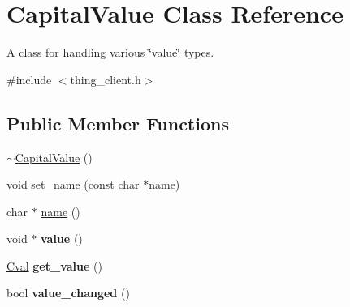 \hypertarget{classCapitalValue}{\section{Capital\-Value Class Reference}
\label{classCapitalValue}
}


A class for handling various \char`\"{}value\char`\"{} types.  




{\ttfamily \#include $<$thing\-\_\-client.\-h$>$}

\subsection*{Public Member Functions}
\begin{DoxyCompactItemize}
\item 
\hyperlink{classCapitalValue_ad85f7a220abaddaa9cd17e8dad2dacf5}{$\sim$\-Capital\-Value} ()
\item 
void \hyperlink{classCapitalValue_a08f54e7ba39a9880e7034867b8ddf68c}{set\-\_\-name} (const char $\ast$\hyperlink{classCapitalValue_a38407e36da9c606b23b2b774b15e6c27}{name})
\item 
char $\ast$ \hyperlink{classCapitalValue_a38407e36da9c606b23b2b774b15e6c27}{name} ()
\item 
\hypertarget{classCapitalValue_aadecfe4b0a0b0dbc50c59a5a04caef36}{void $\ast$ {\bfseries value} ()}\label{classCapitalValue_aadecfe4b0a0b0dbc50c59a5a04caef36}

\item 
\hypertarget{classCapitalValue_ad2a8789ed2fcd5667291397e633cb8d3}{\hyperlink{union__cvalue}{Cval} {\bfseries get\-\_\-value} ()}\label{classCapitalValue_ad2a8789ed2fcd5667291397e633cb8d3}

\item 
\hypertarget{classCapitalValue_a13c89b69d67f2ce86db058cdf9e02d3c}{bool {\bfseries value\-\_\-changed} ()}\label{classCapitalValue_a13c89b69d67f2ce86db058cdf9e02d3c}

\end{DoxyCompactItemize}
